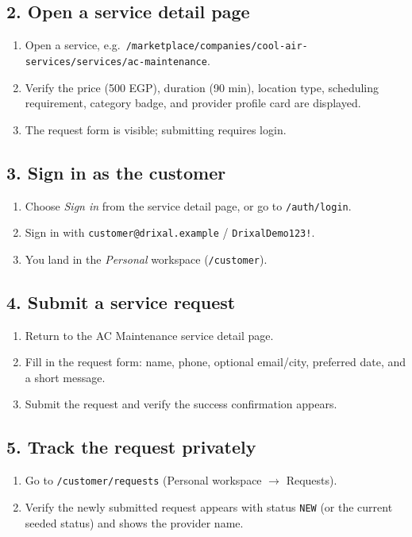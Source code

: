 \documentclass[11pt,a4paper]{article}
\begin{document}
\subsection{2. Open a service detail page}
\begin{enumerate}[leftmargin=2em, itemsep=2pt]
  \item Open a service, e.g.\ \texttt{/marketplace/companies/cool-air-services/services/ac-maintenance}.
  \item Verify the price (500 EGP), duration (90 min), location type, scheduling requirement, category badge, and provider profile card are displayed.
  \item The request form is visible; submitting requires login.
\end{enumerate}

\subsection{3. Sign in as the customer}
\begin{enumerate}[leftmargin=2em, itemsep=2pt]
  \item Choose \emph{Sign in} from the service detail page, or go to \texttt{/auth/login}.
  \item Sign in with \texttt{customer@drixal.example} / \texttt{DrixalDemo123!}.
  \item You land in the \emph{Personal} workspace (\texttt{/customer}).
\end{enumerate}

\subsection{4. Submit a service request}
\begin{enumerate}[leftmargin=2em, itemsep=2pt]
  \item Return to the AC Maintenance service detail page.
  \item Fill in the request form: name, phone, optional email/city, preferred date, and a short message.
  \item Submit the request and verify the success confirmation appears.
\end{enumerate}

\subsection{5. Track the request privately}
\begin{enumerate}[leftmargin=2em, itemsep=2pt]
  \item Go to \texttt{/customer/requests} (Personal workspace $\rightarrow$ Requests).
  \item Verify the newly submitted request appears with status \texttt{NEW} (or the current seeded status) and shows the provider name.
\end{enumerate}
\end{document}
